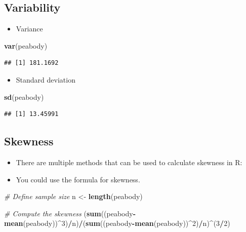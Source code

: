 \documentclass[
]{book}
\newenvironment{Shaded}{\begin{snugshade}}{\end{snugshade}}
\newcommand{\CommentTok}[1]{\textcolor[rgb]{0.56,0.35,0.01}{\textit{#1}}}
\newcommand{\DecValTok}[1]{\textcolor[rgb]{0.00,0.00,0.81}{#1}}
\newcommand{\FunctionTok}[1]{\textcolor[rgb]{0.13,0.29,0.53}{\textbf{#1}}}
\newcommand{\NormalTok}[1]{#1}
\newcommand{\OtherTok}[1]{\textcolor[rgb]{0.56,0.35,0.01}{#1}}
\newcommand{\SpecialCharTok}[1]{\textcolor[rgb]{0.81,0.36,0.00}{\textbf{#1}}}
\providecommand{\tightlist}{%
  \setlength{\itemsep}{0pt}\setlength{\parskip}{0pt}}
\begin{document}
\subsection{Variability}\label{variability}

\begin{itemize}
\tightlist
\item
  Variance
\end{itemize}

\begin{Shaded}
\begin{Highlighting}[]
\FunctionTok{var}\NormalTok{(peabody)}
\end{Highlighting}
\end{Shaded}

\begin{verbatim}
## [1] 181.1692
\end{verbatim}

\begin{itemize}
\tightlist
\item
  Standard deviation
\end{itemize}

\begin{Shaded}
\begin{Highlighting}[]
\FunctionTok{sd}\NormalTok{(peabody)}
\end{Highlighting}
\end{Shaded}

\begin{verbatim}
## [1] 13.45991
\end{verbatim}

\subsection{Skewness}\label{skewness}

\begin{itemize}
\item
  There are multiple methods that can be used to calculate skewness in R:
\item
  You could use the formula for skewness.
\end{itemize}

\begin{Shaded}
\begin{Highlighting}[]
\CommentTok{\# Define sample size}
\NormalTok{n }\OtherTok{\textless{}{-}} \FunctionTok{length}\NormalTok{(peabody)}

\CommentTok{\# Compute the skewness}
\NormalTok{(}\FunctionTok{sum}\NormalTok{((peabody}\SpecialCharTok{{-}}\FunctionTok{mean}\NormalTok{(peabody))}\SpecialCharTok{\^{}}\DecValTok{3}\NormalTok{)}\SpecialCharTok{/}\NormalTok{n)}\SpecialCharTok{/}\NormalTok{(}\FunctionTok{sum}\NormalTok{((peabody}\SpecialCharTok{{-}}\FunctionTok{mean}\NormalTok{(peabody))}\SpecialCharTok{\^{}}\DecValTok{2}\NormalTok{)}\SpecialCharTok{/}\NormalTok{n)}\SpecialCharTok{\^{}}\NormalTok{(}\DecValTok{3}\SpecialCharTok{/}\DecValTok{2}\NormalTok{)}
\end{Highlighting}
\end{Shaded}
\end{document}
